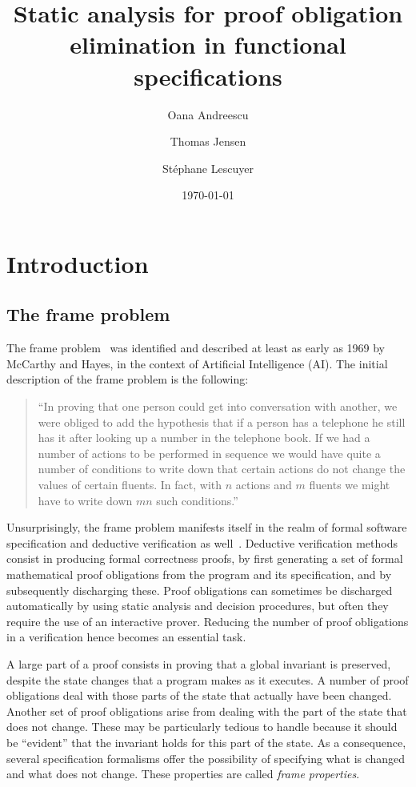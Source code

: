 \documentclass[11pt]{article}
\title{Static analysis for proof obligation elimination in functional
  specifications}
\author{Oana Andreescu \and Thomas Jensen \and St\'ephane Lescuyer}
\date{\today}
\begin{document}
\begin{abstract}

\end{abstract}


\section{Introduction}

\subsection{The frame problem}

The frame problem~\cite{mccarthy69} was identified and described at
least as early as 1969 by McCarthy and Hayes, in the context of
Artificial Intelligence (AI). The initial description of the
frame problem is the following:

\begin{quotation}
``In proving that one person could get into conversation with another, we were
  obliged to add the hypothesis that if a person has a telephone he still has it
  after looking up a number in the telephone book. If we had a number of actions
  to be performed in sequence we would have quite a number of conditions to
  write down that certain actions do not change the values of certain
  fluents. In fact, with $n$ actions and $m$ fluents we might have to write down
  $mn$ such conditions.''
\end{quotation}

Unsurprisingly, 
the frame problem manifests itself in the realm of formal software
specification and deductive verification as well~\cite{borgida93}.
Deductive verification methods consist in producing formal correctness
proofs, by first generating a set of formal mathematical proof
obligations from the program and its specification, and by
subsequently discharging these. Proof
obligations can sometimes be discharged automatically by using static
analysis and decision procedures, but  often they require the use of
an interactive prover. Reducing the number of proof obligations in a
verification hence becomes an essential task. 

A large part of a proof consists in proving that a global invariant is
preserved, despite the state changes that a program makes
as it executes.  A number of proof obligations deal with those parts of the
state that actually have been changed. Another set of proof
obligations arise from dealing with the part of the state that does
not change. These may be particularly tedious to handle because it 
should be ``evident'' that the invariant holds for this part of the
state. As a consequence, several specification formalisms offer the
possibility of specifying what is changed and what does not
change. These properties are called \emph{frame properties}.
\end{document}
